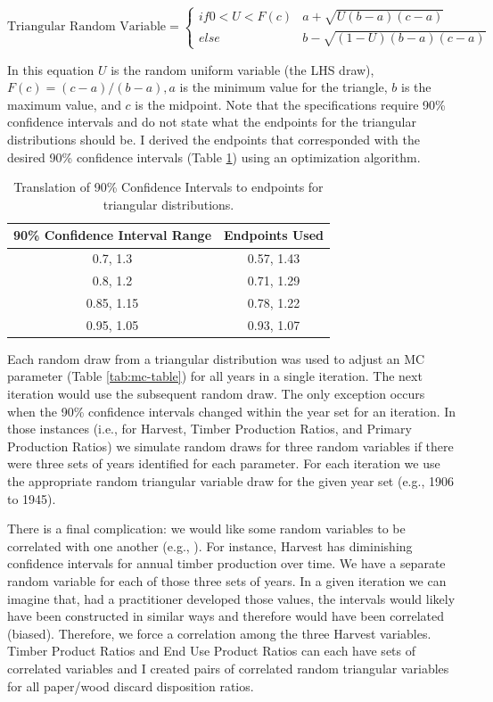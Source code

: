 \documentclass[
]{book}
\begin{document}
\[   \text{Triangular Random Variable} =
  \begin{cases}
    if 0 < U < F(c)       & a + \sqrt{U(b-a)(c-a)}\\
    else  & b - \sqrt{(1-U)(b-a)(c-a)}
  \end{cases} \]

In this equation \(U\) is the random uniform variable (the LHS draw), \(F(c)=(c-a)/(b-a), a\) is the minimum value for the triangle, \(b\) is the maximum value, and \(c\) is the midpoint. Note that the specifications require 90\% confidence intervals and do not state what the endpoints for the triangular distributions should be. I derived the endpoints that corresponded with the desired 90\% confidence intervals (Table \ref{tab:triang-tab}) using an optimization algorithm.

\begin{table}

\caption{\label{tab:triang-tab}Translation of 90\% Confidence Intervals to endpoints for triangular distributions.}
\centering
\begin{tabular}[t]{cc}
\toprule
90\% Confidence Interval Range & Endpoints Used\\
\midrule
0.7, 1.3 & 0.57, 1.43\\
0.8, 1.2 & 0.71, 1.29\\
0.85, 1.15 & 0.78, 1.22\\
0.95, 1.05 & 0.93, 1.07\\
\bottomrule
\end{tabular}
\end{table}

Each random draw from a triangular distribution was used to adjust an MC parameter (Table \ref{tab:mc-table}) for all years in a single iteration. The next iteration would use the subsequent random draw. The only exception occurs when the 90\% confidence intervals changed within the year set for an iteration. In those instances (i.e., for Harvest, Timber Production Ratios, and Primary Production Ratios) we simulate random draws for three random variables if there were three sets of years identified for each parameter. For each iteration we use the appropriate random triangular variable draw for the given year set (e.g., 1906 to 1945).

There is a final complication: we would like some random variables to be correlated with one another (e.g., \citet{stockmann2012}). For instance, Harvest has diminishing confidence intervals for annual timber production over time. We have a separate random variable for each of those three sets of years. In a given iteration we can imagine that, had a practitioner developed those values, the intervals would likely have been constructed in similar ways and therefore would have been correlated (biased). Therefore, we force a correlation among the three Harvest variables. Timber Product Ratios and End Use Product Ratios can each have sets of correlated variables and I created pairs of correlated random triangular variables for all paper/wood discard disposition ratios.
\end{document}
